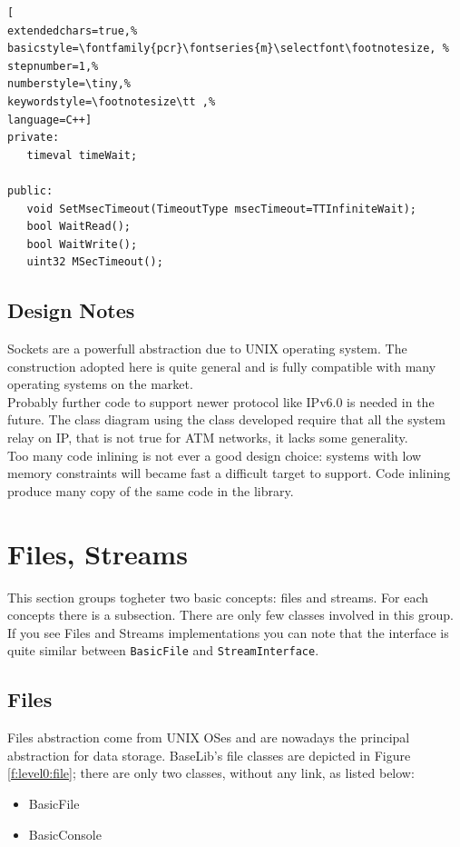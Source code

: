 \begin{lstlisting}[
extendedchars=true,%
basicstyle=\fontfamily{pcr}\fontseries{m}\selectfont\footnotesize, %
stepnumber=1,%
numberstyle=\tiny,%
keywordstyle=\footnotesize\tt ,%
language=C++]
private:
   timeval timeWait;

public:
   void SetMsecTimeout(TimeoutType msecTimeout=TTInfiniteWait);
   bool WaitRead();
   bool WaitWrite();
   uint32 MSecTimeout();
\end{lstlisting}



\subsection{Design Notes}

Sockets are a powerfull abstraction due to UNIX operating system. The construction adopted here is quite general and is fully compatible with many operating systems on the market. \\


Probably further code to support newer protocol like IPv6.0 is needed in the future. The class diagram using the class developed require that all the system relay on IP, that is not true for ATM networks, it lacks some generality. \\


Too many code inlining is not ever a good design choice: systems with low memory constraints will became fast a difficult target to support. Code inlining produce many copy of the same code in the library.\\



\section{Files, Streams}
This section groups togheter two basic concepts: files and streams. For each concepts there is a subsection. There are only few classes involved in this group.
If you see Files and Streams implementations you can note that the interface is quite similar between \texttt{BasicFile} and \texttt{StreamInterface}.



\subsection{Files}
Files abstraction come from UNIX OSes and are nowadays the principal abstraction for data storage. BaseLib's file classes are depicted in Figure \ref{f:level0:file}; there are only two classes, without any link, as listed below:
\begin{itemize}
 \item BasicFile
 \item BasicConsole
\end{itemize}

